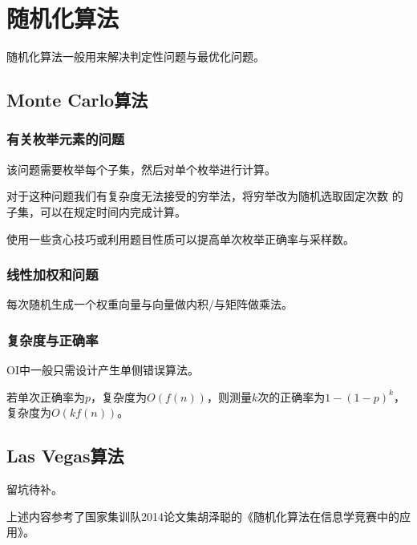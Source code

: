 \section{随机化算法}
随机化算法一般用来解决判定性问题与最优化问题。
\subsection{Monte Carlo算法}
\subsubsection{有关枚举元素的问题}
该问题需要枚举每个子集，然后对单个枚举进行计算。

对于这种问题我们有复杂度无法接受的穷举法，将穷举改为随机选取固定次数
的子集，可以在规定时间内完成计算。

使用一些贪心技巧或利用题目性质可以提高单次枚举正确率与采样数。
\subsubsection{线性加权和问题}
每次随机生成一个权重向量与向量做内积/与矩阵做乘法。
\subsubsection{复杂度与正确率}
OI中一般只需设计产生单侧错误算法。

若单次正确率为$p$，复杂度为$O(f(n))$，则测量$k$次的正确率为$1-(1-p)^k$，
复杂度为$O(kf(n))$。
\subsection{Las Vegas算法}
留坑待补。

上述内容参考了国家集训队2014论文集胡泽聪的《随机化算法在信息学竞赛中的应用》。
